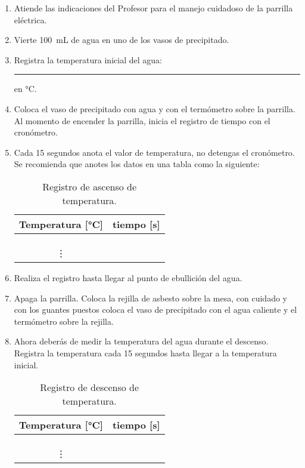 \documentclass[14pt]{extarticle}
\begin{document}
\begin{enumerate}
\item Atiende las indicaciones del Profesor para el manejo cuidadoso de la parrilla eléctrica.
\item Vierte \SI{100}{\milli\liter} de agua en uno de los vasos de precipitado.
\item Registra la temperatura inicial del agua: \rule{2cm}{0.1mm} en \si{\degreeCelsius}.
\item Coloca el vaso de precipitado con agua y con el termómetro sobre la parrilla. Al momento de encender la parrilla, inicia el registro de tiempo con el cronómetro.
\item Cada \num{15} segundos anota el valor de temperatura, no detengas el cronómetro. Se recomienda que anotes los datos en una tabla como la siguiente:
\begin{table}[H]
\centering
\begin{tabular}{| c | c |} \hline
Temperatura [\si{\degreeCelsius}] & tiempo [\si{\second}] \\ \hline
 & \\ \hline
 & \\ \hline
 & \\ \hline
\vdots & \\ \hline
\end{tabular}
\caption{Registro de ascenso de temperatura.}
\end{table}
\item Realiza el registro hasta llegar al punto de ebullición del agua.
\item Apaga la parrilla. Coloca la rejilla de asbesto sobre la mesa, con cuidado y con los guantes puestos coloca el vaso de precipitado con el agua caliente y el termómetro sobre la rejilla.
\item Ahora deberás de medir la temperatura del agua durante el descenso. Registra la temperatura cada \num{15} segundos hasta llegar a la temperatura inicial.
\begin{table}[H]
\centering
\begin{tabular}{| c | c |} \hline
Temperatura [\si{\degreeCelsius}] & tiempo [\si{\second}] \\ \hline
 & \\ \hline
 & \\ \hline
 & \\ \hline
\vdots & \\ \hline
\end{tabular}
\caption{Registro de descenso de temperatura.}
\end{table}
\end{enumerate}
\end{document}

